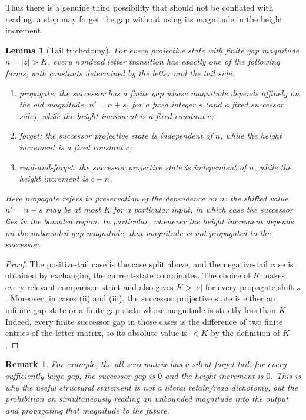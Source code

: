 \documentclass[11pt]{article}
\newtheorem{lemma}[theorem]{Lemma}
\newtheorem{remark}[theorem]{Remark}
\begin{document}
Thus there is a genuine third possibility that should not be conflated with reading: a step may forget the gap without using its magnitude in the height increment.

\begin{lemma}[Tail trichotomy]\label{lem:tail}
For every projective state with finite gap magnitude $n=|z|>K$, every nondead letter transition has exactly one of the following forms, with constants determined by the letter and the tail side:
\begin{enumerate}[label=(\roman*)]
\item \emph{propagate}: the successor has a finite gap whose magnitude depends affinely on the old magnitude, $n'=n+s$, for a fixed integer $s$ (and a fixed successor side), while the height increment is a fixed constant $c$;
\item \emph{forget}: the successor projective state is independent of $n$, while the height increment is a fixed constant $c$;
\item \emph{read-and-forget}: the successor projective state is independent of $n$, while the height increment is $c-n$.
\end{enumerate}
Here \emph{propagate} refers to preservation of the dependence on $n$: the shifted value $n'=n+s$ may be at most $K$ for a particular input, in which case the successor lies in the bounded region. In particular, whenever the height increment depends on the unbounded gap magnitude, that magnitude is not propagated to the successor.
\end{lemma}

\begin{proof}
The positive-tail case is the case split above, and the negative-tail case is obtained by exchanging the current-state coordinates. The choice of $K$ makes every relevant comparison strict and also gives $K>|s|$ for every propagate shift $s$.
Moreover, in cases (ii) and (iii), the successor projective state is either an infinite-gap state or a finite-gap state whose magnitude is strictly less than $K$. Indeed, every finite successor gap in those cases is the difference of two finite entries of the letter matrix, so its absolute value is $<K$ by the definition of $K$.
\end{proof}

\begin{remark}
For example, the all-zero matrix has a silent forget tail: for every sufficiently large gap, the successor gap is $0$ and the height increment is $0$. This is why the useful structural statement is not a literal retain/read dichotomy, but the prohibition on simultaneously reading an unbounded magnitude into the output and propagating that magnitude to the future.
\end{remark}
\end{document}
